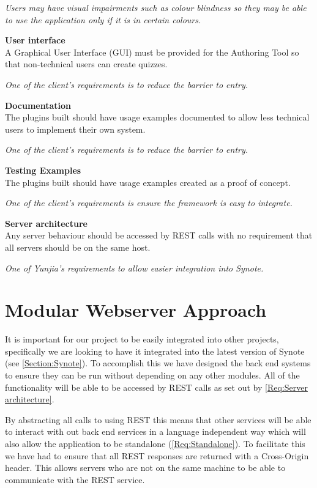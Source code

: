 \begin{requirement}[label=\textbf{N\arabic*}]
\textit{Users may have visual impairments such as colour blindness so they may be able to use the application only if it is in certain colours.}
\item \textbf{User interface} \label{Req:User interface} \hfill \\ A Graphical User Interface (GUI) must be provided for the Authoring Tool so that non-technical users can create quizzes.

\textit{One of the client's requirements is to reduce the barrier to entry.}
\item \textbf{Documentation} \label{Req:Documentation} \hfill \\ The plugins built should have usage examples documented to allow less technical users to implement their own system.

\textit{One of the client's requirements is to reduce the barrier to entry.}
\item \textbf{Testing Examples} \label{Req:Testing Examples} \hfill \\ The plugins built should have usage examples created as a proof of concept.

\textit{One of the client's requirements is ensure the framework is easy to integrate.}
\item \textbf{Server architecture} \label{Req:Server architecture} \hfill \\ Any server behaviour should be accessed by \gls{REST} calls with no requirement that all servers should be on the same host.

\textit{One of Yunjia's requirements to allow easier integration into Synote.}
\end{requirement}

\section{Modular Webserver Approach}
\label{Section:Modular Approach}

It is important for our project to be easily integrated into other projects, specifically we are looking to have it integrated into the latest version of Synote (see \autoref{Section:Synote}). To accomplish this we have designed the back end systems to ensure they can be run without depending on any other modules. All of the functionality will be able to be accessed by \gls{REST} calls as set out by \cref{Req:Server architecture}.

By abstracting all calls to using \gls{REST} this means that other services will be able to interact with out back end services in a language independent way which will also allow the application to be standalone (\cref{Req:Standalone}). To facilitate this we have had to ensure that all \gls{REST} responses are returned with a Cross-Origin header. This allows servers who are not on the same machine to be able to communicate with the \gls{REST} service.

